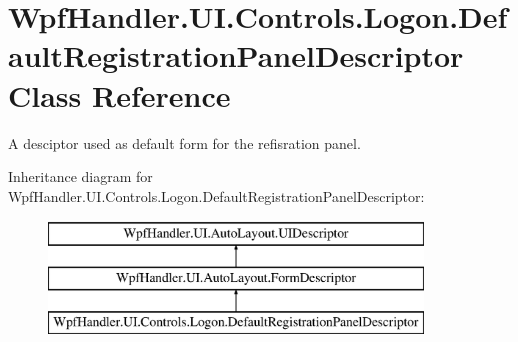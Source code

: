 \hypertarget{class_wpf_handler_1_1_u_i_1_1_controls_1_1_logon_1_1_default_registration_panel_descriptor}{}\section{Wpf\+Handler.\+U\+I.\+Controls.\+Logon.\+Default\+Registration\+Panel\+Descriptor Class Reference}
\label{class_wpf_handler_1_1_u_i_1_1_controls_1_1_logon_1_1_default_registration_panel_descriptor}


A desciptor used as default form for the refisration panel.  


Inheritance diagram for Wpf\+Handler.\+U\+I.\+Controls.\+Logon.\+Default\+Registration\+Panel\+Descriptor\+:\begin{figure}[H]
\begin{center}
\leavevmode
\includegraphics[height=3.000000cm]{d4/daf/class_wpf_handler_1_1_u_i_1_1_controls_1_1_logon_1_1_default_registration_panel_descriptor}
\end{center}
\end{figure}
